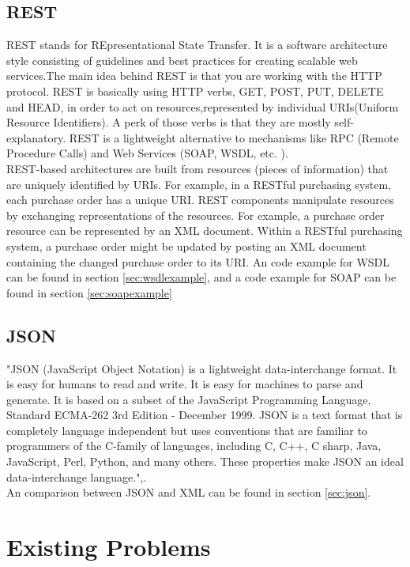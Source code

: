 \documentclass[12pt]{article}
\begin{document}
\subsection{REST}
REST stands for REpresentational State Transfer. It is a software architecture style consisting of guidelines and best practices 
for creating scalable web services.The main idea behind REST is that you are working with the HTTP protocol. REST is basically using HTTP verbs, GET, POST, PUT, DELETE and HEAD, in order to act on resources,represented by individual URIs(Uniform Resource Identifiers). 
A perk of those verbs is that they are mostly self-explanatory. REST is a lightweight alternative to mechanisms like RPC (Remote Procedure Calls) and Web Services (SOAP, WSDL, etc. ). \\
REST-based architectures are built from resources (pieces of information) that are uniquely identified by URIs. For example, in a RESTful purchasing system, each purchase order has a unique URI.
REST components manipulate resources by exchanging representations of the resources. For example, a purchase order resource can be represented by an XML document. Within a RESTful purchasing system, a purchase order might be updated by posting an XML document containing the changed purchase order to its URI.
An code example for WSDL can be found in section \ref{sec:wsdlexample}, 
and a code example for SOAP can be found in section \ref{sec:soapexample}
\subsection{JSON}
"JSON (JavaScript Object Notation) is a lightweight data-interchange format. It is easy for humans to read and write. It is easy for machines to parse and generate. It is based on a subset of the JavaScript Programming Language, Standard ECMA-262 3rd Edition - December 1999. JSON is a text format that is completely language independent but uses conventions that are familiar to programmers of the C-family of languages, including C, C++, C sharp, Java, JavaScript, Perl, Python, and many others. These properties make JSON an ideal data-interchange language.",\cite{json}.\\
An comparison between JSON and XML can be found in section \ref{sec:json}.
\section{Existing Problems}
\end{document}
